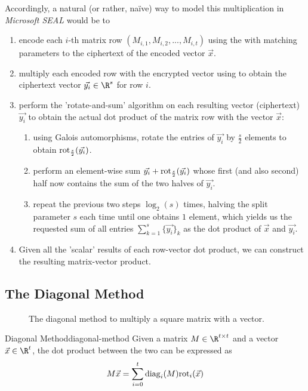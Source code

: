 Accordingly, a natural (or rather, naïve) way to model this multiplication in \textit{Microsoft SEAL} would be to
\begin{enumerate}
  \item encode each $i$-th matrix row $(M_{i,1}, M_{i,2}, ..., M_{i,t})$ using the 
        with matching parameters to the ciphertext of the encoded vector $\vec{x}$.
  \item multiply each encoded row with the encrypted vector using 
        to obtain the ciphertext vector $\vec{y_i} \in \R^s$ for row $i$.
  \item perform the 'rotate-and-sum' algorithm \parencite{2018-gazelle} on each
        resulting vector (ciphertext) $\vec{y_i}$ to obtain the actual dot product
        of the matrix row with the vector $\vec{x}$:
        \begin{enumerate}
          \item using Galois automorphisms, rotate the entries of $\vec{y_i}$ by $\frac{s}{2}$ elements
                to obtain $\mathrm{rot}_{\frac{s}{2}}(\vec{y_i})$.
          \item perform an element-wise sum $\vec{y_i} + \mathrm{rot}_{\frac{s}{2}}(\vec{y_i})$
                whose first (and also second) half now contains the sum of the two halves of $\vec{y_i}$.
          \item repeat the previous two steps $\log_2(s)$ times, halving the
                split parameter $s$ each time until one obtains $1$ element,
                which yields us the requested sum of all entries $\sum_{k=1}^s \{\vec{y_i}\}_k$
                as the dot product of $\vec{x}$ and $\vec{y_i}$.
        \end{enumerate}
  \item Given all the 'scalar' results of each row-vector dot product,
        we can construct the resulting matrix-vector product.
\end{enumerate}

\subsection{The Diagonal Method}
\begin{figure}[H]
  \centering
  \caption[Image adapted from \cite{2018-gazelle}]{The diagonal method to multiply a square matrix with a vector.}
\end{figure}

\begin{theorem}{Diagonal Method}{diagonal-method}
  Given a matrix $M \in \R^{t \times t}$ and a vector $\vec{x} \in \R^t$,
  the dot product between the two can be expressed as
  \begin{equation}
    M \vec{x} = \sum_{i=0}^t \mathrm{diag}_i(M) \mathrm{rot}_i(\vec{x})
  \end{equation}
\end{theorem}

